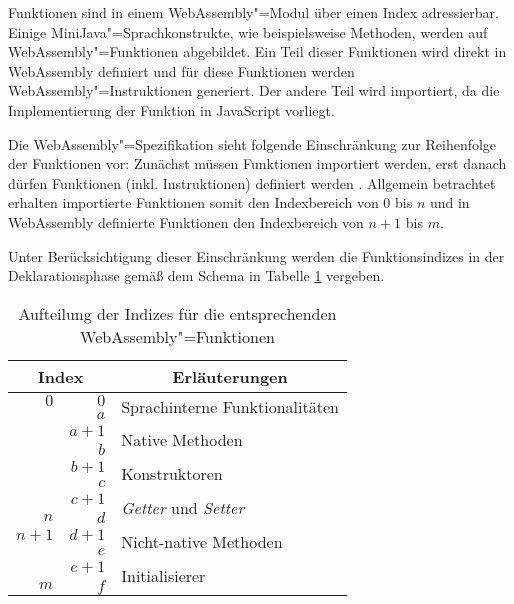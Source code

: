 Funktionen sind in einem WebAssembly"=Modul über einen Index adressierbar. Einige MiniJava"=Sprachkonstrukte, wie beispielsweise Methoden, werden auf WebAssembly"=Funktionen abgebildet. Ein Teil dieser Funktionen wird direkt in WebAssembly definiert und für diese Funktionen werden WebAssembly"=Instruktionen generiert. Der andere Teil wird importiert, da die Implementierung der Funktion in JavaScript vorliegt.

Die WebAssembly"=Spezifikation sieht folgende Einschränkung zur Reihenfolge der Funktionen vor: Zunächst müssen Funktionen importiert werden, erst danach dürfen Funktionen (inkl. Instruktionen) definiert werden \cite{WebAssemblySpecification}. Allgemein betrachtet erhalten importierte Funktionen somit den Indexbereich von $0$ bis $n$ und in WebAssembly definierte Funktionen den Indexbereich von $n+1$ bis $m$.

Unter Berücksichtigung dieser Einschränkung werden die Funktionsindizes in der Deklarationsphase gemäß dem Schema in Tabelle \ref{tab:functionIndices} vergeben.

\begin{table}[b]
    \centering
    \begin{tabular}{| r | r | l |}
        \hline
        \multicolumn{2}{|c|}{Index} & \multicolumn{1}{|c|}{Erläuterungen} \\
        \hline
        \hline
        $0$ & $0$ & \multirow{2}{*}{Sprachinterne Funktionalitäten} \\
        & $a$ & \\
        \hline
        & $a+1$ & \multirow{2}{*}{Native Methoden} \\
        & $b$ & \\
        \hline
        & $b+1$ & \multirow{2}{*}{Konstruktoren} \\
        & $c$ & \\
        \hline
        & $c+1$ & \multirow{2}{*}{\emph{Getter} und \emph{Setter}} \\
        $n$ & $d$ & \\
        \hline \hline
        $n+1$ & $d+1$ & \multirow{2}{*}{Nicht-native Methoden} \\
        & $e$ & \\
        \hline
        & $e+1$ & \multirow{2}{*}{Initialisierer} \\
        $m$ & $f$ & \\
        \hline
    \end{tabular}
    \caption{Aufteilung der Indizes für die entsprechenden WebAssembly"=Funktionen}
    \label{tab:functionIndices}
\end{table}

